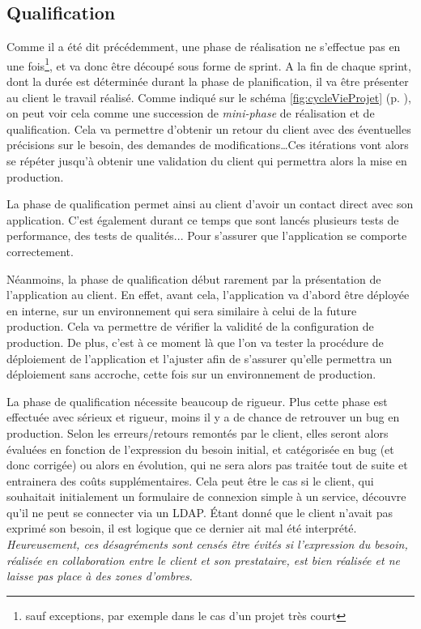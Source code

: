 \subsection{Qualification}


Comme il a été dit précédemment, une phase de réalisation ne s'effectue pas en une fois\footnote{sauf exceptions, par exemple dans le cas d'un projet très court}, et va donc être découpé sous forme de sprint. A la fin de chaque sprint, dont la durée est déterminée durant la phase de planification, il va être présenter au client le travail réalisé. Comme indiqué sur le schéma \ref{fig:cycleVieProjet} (p. \pageref{fig:cycleVieProjet}), on peut voir cela comme une succession de \emph{mini-phase} de réalisation et de qualification. Cela va permettre d'obtenir un retour du client avec des éventuelles précisions sur le besoin, des demandes de modifications\ldots Ces itérations vont alors se répéter jusqu'à obtenir une validation du client qui permettra alors la mise en production.

La phase de qualification permet ainsi au client d'avoir un contact direct avec son application. C'est également durant ce temps que sont lancés plusieurs tests de performance, des tests de qualités... Pour s'assurer que l'application se comporte correctement.

Néanmoins, la phase de qualification début rarement par la présentation de l'application au client. En effet, avant cela, l'application va d'abord être déployée en interne, sur un environnement qui sera similaire à celui de la future production. Cela va permettre de vérifier la validité de la configuration de production. De plus, c'est à ce moment là que l'on va tester la procédure de déploiement de l'application et l'ajuster afin de s'assurer qu'elle permettra un déploiement sans accroche, cette fois sur un environnement de production.

La phase de qualification nécessite beaucoup de rigueur. Plus cette phase est effectuée avec sérieux et rigueur, moins il y a de chance de retrouver un bug en production. Selon les erreurs/retours remontés par le client, elles seront alors évaluées en fonction de l'expression du besoin initial, et catégorisée en bug (et donc corrigée) ou alors en évolution, qui ne sera alors pas traitée tout de suite et entrainera des coûts supplémentaires. Cela peut être le cas si le client, qui souhaitait initialement un formulaire de connexion simple à un service, découvre qu'il ne peut se connecter via un \gls{LDAP}. Étant donné que le client n'avait pas exprimé son besoin, il est logique que ce dernier ait mal été interprété. \emph{Heureusement, ces désagréments sont censés être évités si l'expression du besoin, réalisée en collaboration entre le client et son prestataire, est bien réalisée et ne laisse pas place à des zones d'ombres.}

